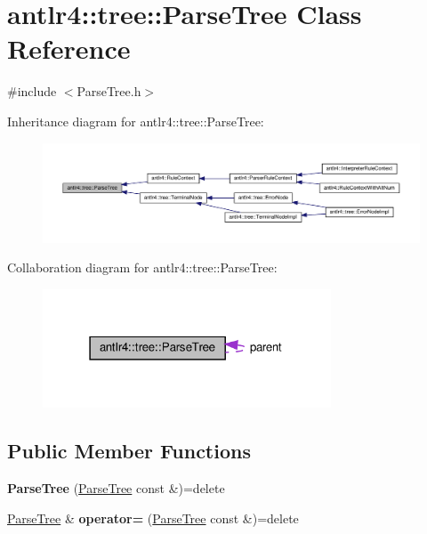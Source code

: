 \hypertarget{classantlr4_1_1tree_1_1ParseTree}{}\section{antlr4\+:\+:tree\+:\+:Parse\+Tree Class Reference}
\label{classantlr4_1_1tree_1_1ParseTree}


{\ttfamily \#include $<$Parse\+Tree.\+h$>$}



Inheritance diagram for antlr4\+:\+:tree\+:\+:Parse\+Tree\+:
\nopagebreak
\begin{figure}[H]
\begin{center}
\leavevmode
\includegraphics[width=350pt]{classantlr4_1_1tree_1_1ParseTree__inherit__graph}
\end{center}
\end{figure}


Collaboration diagram for antlr4\+:\+:tree\+:\+:Parse\+Tree\+:
\nopagebreak
\begin{figure}[H]
\begin{center}
\leavevmode
\includegraphics[width=243pt]{classantlr4_1_1tree_1_1ParseTree__coll__graph}
\end{center}
\end{figure}
\subsection*{Public Member Functions}
\begin{DoxyCompactItemize}
\item 
\mbox{\label{classantlr4_1_1tree_1_1ParseTree_a12143657590efe85f35f76c68134d666}} 
{\bfseries Parse\+Tree} (\hyperlink{classantlr4_1_1tree_1_1ParseTree}{Parse\+Tree} const \&)=delete
\item 
\mbox{\label{classantlr4_1_1tree_1_1ParseTree_a785332e4215830db13155e7989a15a91}} 
\hyperlink{classantlr4_1_1tree_1_1ParseTree}{Parse\+Tree} \& {\bfseries operator=} (\hyperlink{classantlr4_1_1tree_1_1ParseTree}{Parse\+Tree} const \&)=delete
\end{DoxyCompactItemize}
